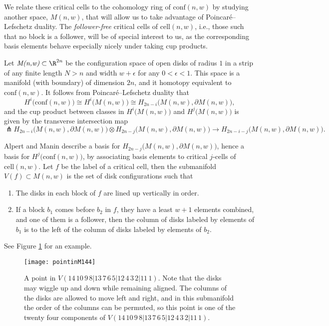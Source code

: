 We relate these critical cells to the cohomology ring of $\text{conf}(n,w)$ by studying another space, $M(n,w)$, that will allow us to take advantage of Poincar\'{e}--Lefschetz duality.
The \emph{follower-free} critical cells of $\text{cell}(n,w)$, i.e., those such that no block is a follower, will be of special interest to us, as the corresponding basis elements behave especially nicely under taking cup products.

Let $\emph{M(n,w)}\subset \R^{2n}$ be the configuration space of open disks of radius $1$ in a strip of any finite length $N>n$ and width $w+\epsilon$ for any $0<\epsilon<1$.
This space is a manifold (with boundary) of dimension $2n$, and it homotopy equivalent to $\text{conf}(n,w)$.
It follows from Poincar\'{e}--Lefschetz duality that
\[
H^{i}\big(\text{conf}(n,w)\big)\cong H^{i}\big(M(n,w)\big)\cong H_{2n-i}\big(M(n,w), \partial M(n,w)\big),
\]
and the cup product between classes in $H^{i}\big(M(n,w)\big)$ and $H^{j}\big(M(n,w)\big)$ is given by the transverse intersection map
\[
\pitchfork H_{2n-i}\big(M(n,w), \partial M(n,w)\big)\otimes H_{2n-j}\big(M(n,w), \partial M(n,w)\big)\to H_{2n-i-j}\big(M(n,w), \partial M(n,w)\big).
\]

Alpert and Manin describe a basis for $H_{2n-j}\big(M(n,w), \partial M(n,w)\big)$, hence a basis for $H^{j}\big(\text{conf}(n,w)\big)$, by associating basis elements to critical $j$-cells of $\text{cell}(n,w)$.
Let $f$ be the label of a critical cell, then the submanifold $V(f)\subset M(n,w)$ is the set of disk configurations such that
\begin{enumerate}
\item The disks in each block of $f$ are lined up vertically in order.
\item If a block $b_{1}$ comes before $b_{2}$ in $f$, they have a least $w+1$ elements combined, and one of them is a follower, then the column of disks labeled by elements of $b_{1}$ is to the left of the column of disks labeled by elements of $b_{2}$.
\end{enumerate}
See Figure \ref{pointinM144} for an example.

\begin{figure}[h]
\centering
\captionsetup{width=.8\linewidth}
\texttt{[image: pointinM144]}
\caption{A point in $V(14\, 10\, 9\, 8|13\, 7\, 6\, 5|12\, 4\,3\, 2|11\,1)$.
Note that the disks may wiggle up and down while remaining aligned.
The columns of the disks are allowed to move left and right, and in this submanifold the order of the columns can be permuted, so this point is one of the twenty four components of $V(14\, 10\, 9\, 8|13\, 7\, 6\, 5|12\, 4\,3\, 2|11\,1)$.
}
\label{pointinM144}
\end{figure}

